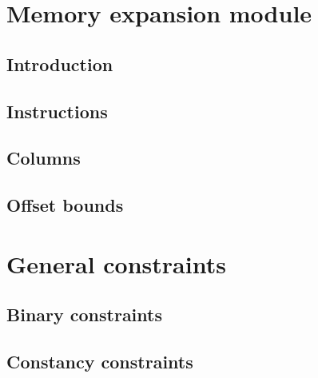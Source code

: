 \section{Memory expansion module}

\subsection{Introduction}                                                      
\subsection{Instructions}                                                      
\subsection{Columns}                                                           
\subsection{Offset bounds}                                                                            \label{mxp: offset bounds}
                                                                                                                            
\section{General constraints}                                                                                        
\subsection{Binary constraints}                                                                        \label{mxp: binary}
\subsection{Constancy constraints}                                                                \label{mxp: counter-constancies}
